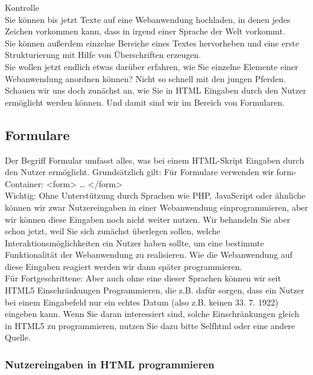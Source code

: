Kontrolle\\

Sie können bis jetzt Texte auf eine Webanwendung hochladen, in denen jedes Zeichen vorkommen kann, dass in irgend einer Sprache der Welt vorkommt.\\

Sie können außerdem einzelne Bereiche eines Textes hervorheben und eine erste Strukturierung mit Hilfe von Überschriften erzeugen.\\

Sie wollen jetzt endlich etwas darüber erfahren, wie Sie einzelne Elemente einer Webanwendung anordnen können? Nicht so schnell mit den jungen Pferden. Schauen wir uns doch zunächst an, wie Sie in HTML Eingaben durch den Nutzer ermöglicht werden können. Und damit sind wir im Bereich von Formularen.

\subsection{Formulare}

Der Begriff Formular umfasst alles, was bei einem HTML-Skript Eingaben durch den Nutzer ermöglicht. Grundsätzlich gilt: Für Formulare verwenden wir form-Container:
<form> … </form>\\

Wichtig: Ohne Unterstützung durch Sprachen wie PHP, JavaScript oder ähnliche können wir zwar Nutzereingaben in einer Webanwendung einprogrammieren, aber wir können diese Eingaben noch nicht weiter nutzen. Wir behandeln Sie aber schon jetzt, weil Sie sich zunächst überlegen sollen, welche Interaktionsmöglichkeiten ein Nutzer haben sollte, um eine bestimmte Funktionalität der Webanwendung zu realisieren. Wie die Webanwendung auf diese Eingaben reagiert werden wir dann später programmieren.\\

Für Fortgeschrittene: Aber auch ohne eine dieser Sprachen können wir seit HTML5 Einschränkungen Programmieren, die z.B. dafür sorgen, dass ein Nutzer bei einem Eingabefeld nur ein echtes Datum (also z.B. keinen 33. 7. 1922) eingeben kann. Wenn Sie daran interessiert sind, solche Einschränkungen gleich in HTML5 zu programmieren, nutzen Sie dazu bitte Selfhtml oder eine andere Quelle.

\subsubsection{Nutzereingaben in HTML programmieren}

